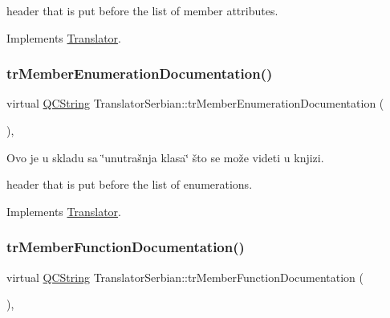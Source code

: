 header that is put before the list of member attributes. 

Implements \mbox{\hyperlink{class_translator}{Translator}}.

\mbox{\label{class_translator_serbian_abd1512013613cc9ae0a6bc43ee68947b}} 
\subsubsection{\texorpdfstring{trMemberEnumerationDocumentation()}{trMemberEnumerationDocumentation()}}
{\footnotesize\ttfamily virtual \mbox{\hyperlink{class_q_c_string}{Q\+C\+String}} Translator\+Serbian\+::tr\+Member\+Enumeration\+Documentation (\begin{DoxyParamCaption}{ }\end{DoxyParamCaption})\hspace{0.3cm}{\ttfamily [inline]}, {\ttfamily [virtual]}}



Ovo je u skladu sa \char`\"{}unutrašnja klasa\char`\"{} što se može videti u knjizi. 

header that is put before the list of enumerations. 

Implements \mbox{\hyperlink{class_translator}{Translator}}.

\mbox{\label{class_translator_serbian_a53ecd045c02cbfaa34f453ec4ec0ecc0}} 
\subsubsection{\texorpdfstring{trMemberFunctionDocumentation()}{trMemberFunctionDocumentation()}}
{\footnotesize\ttfamily virtual \mbox{\hyperlink{class_q_c_string}{Q\+C\+String}} Translator\+Serbian\+::tr\+Member\+Function\+Documentation (\begin{DoxyParamCaption}{ }\end{DoxyParamCaption})\hspace{0.3cm}{\ttfamily [inline]}, {\ttfamily [virtual]}}

